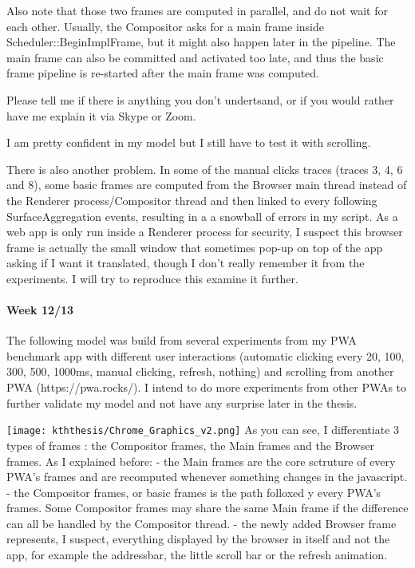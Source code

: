 \documentclass{kththesis}
\begin{document}
Also note that those two frames are computed in parallel, and do not wait for each other. Usually, the Compositor asks for a main frame inside  Scheduler::BeginImplFrame, but it might also happen later in the pipeline. The main frame can also be committed and activated too late, and thus the basic frame pipeline is re-started after the main frame was computed.

Please tell me if there is anything you don't undertsand, or if you would rather have me explain it via Skype or Zoom.

I am pretty confident in my model but I still have to test it with scrolling.

There is also another problem. In some of the manual clicks traces (traces 3, 4, 6 and 8), some basic frames are computed from the Browser main thread instead of the Renderer process/Compositor thread and then linked to every following SurfaceAggregation events, resulting in a a snowball of errors in my script. As a web app is only run inside a Renderer process for security, I suspect this browser frame is actually the small window that sometimes pop-up on top of the app asking if I want it translated, though I don't really remember it from the experiments. I will try to reproduce this examine it further.

\paragraph{Week 12/13}
The following model was build from several experiments from my PWA benchmark app with different user interactions (automatic clicking every 20, 100, 300, 500, 1000ms, manual clicking, refresh, nothing) and scrolling from another PWA (https://pwa.rocks/). I intend to do more experiments from other PWAs to further validate my model and not have any surprise later in the thesis.


\texttt{[image: kththesis/Chrome\_Graphics\_v2.png]}
\newline
As you can see, I differentiate 3 types of frames : the Compositor frames, the Main frames and the Browser frames.
As I explained before:
    - the Main frames are the core sctruture of every PWA's frames and are recomputed whenever something changes in the javascript.
    - the Compositor frames, or basic frames is the path folloxed y every PWA's frames. Some Compositor frames may share the same Main frame if the difference can all be handled by the Compositor thread.
    - the newly added Browser frame represents, I suspect, everything displayed by the browser in itself and not the app, for example the addressbar, the little scroll bar or the refresh animation.
\end{document}
